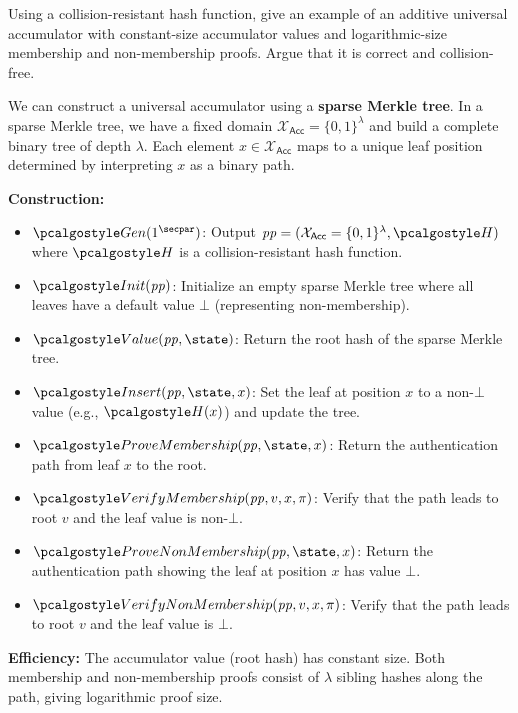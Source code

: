 \begin{exercise}[Optional]
  Using a collision-resistant hash function, give an example of an additive universal accumulator with constant-size accumulator values and logarithmic-size membership and non-membership proofs.
  Argue that it is correct and collision-free.
\end{exercise}

\ifsolutions
\begin{mysolution}
  We can construct a universal accumulator using a \textbf{sparse Merkle tree}.
  In a sparse Merkle tree, we have a fixed domain $\mathcal{X}_\mathsf{Acc} = \{0,1\}^\lambda$ and build a complete binary tree of depth $\lambda$.
  Each element $x \in \mathcal{X}_\mathsf{Acc}$ maps to a unique leaf position determined by interpreting $x$ as a binary path.
  
  \textbf{Construction:}
  \begin{itemize}
    \item $\algo{Gen}(1^\secpar)$: Output $\params = (\mathcal{X}_\mathsf{Acc} = \{0,1\}^\lambda, \algo{H})$ where $\algo{H}$ is a collision-resistant hash function.
    \item $\algo{Init}(\params)$: Initialize an empty sparse Merkle tree where all leaves have a default value $\bot$ (representing non-membership).
    \item $\algo{Value}(\params, \state)$: Return the root hash of the sparse Merkle tree.
    \item $\algo{Insert}(\params, \state, x)$: Set the leaf at position $x$ to a non-$\bot$ value (e.g., $\algo{H}(x)$) and update the tree.
    \item $\algo{ProveMembership}(\params, \state, x)$: Return the authentication path from leaf $x$ to the root.
    \item $\algo{VerifyMembership}(\params, v, x, \pi)$: Verify that the path leads to root $v$ and the leaf value is non-$\bot$.
    \item $\algo{ProveNonMembership}(\params, \state, x)$: Return the authentication path showing the leaf at position $x$ has value $\bot$.
    \item $\algo{VerifyNonMembership}(\params, v, x, \pi)$: Verify that the path leads to root $v$ and the leaf value is $\bot$.
  \end{itemize}
  
  \textbf{Efficiency:} The accumulator value (root hash) has constant size.
  Both membership and non-membership proofs consist of $\lambda$ sibling hashes along the path, giving logarithmic proof size.
  

\end{mysolution}
